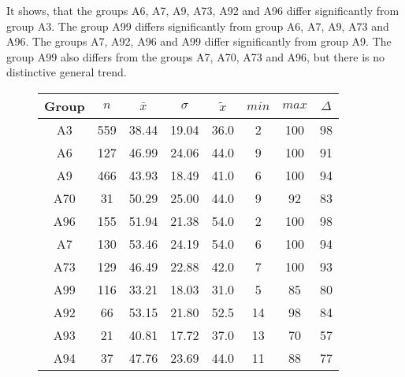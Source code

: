 It shows, that the groups A6, A7, A9, A73, A92 and A96 differ significantly from group A3. The group A99 differs significantly from group A6, A7, A9, A73 and A96. The groups A7, A92, A96 and A99 differ significantly from group A9. The group A99 also differs from the groups A7, A70, A73 and A96, but there is no distinctive general trend. 
\begin{figure}[ht!]
	\centering
	\begin{minipage}{0.5\textwidth}
		\tiny
		\setlength{\tabcolsep}{4pt}
		\centering
		\begin{tabular}{c|c|c|c|c|c|c|c}
			\toprule
			Group & $n$ & $\bar{x}$ & $\sigma$ & $\tilde{x}$ & $min$ & $max$ & $\Delta$ \\
			\midrule
			A3  & 559 & 38.44 & 19.04 & 36.0 & 2  & 100 & 98 \\ 
			A6  & 127 & 46.99 & 24.06 & 44.0 & 9  & 100 & 91 \\ 
			A9  & 466 & 43.93 & 18.49 & 41.0 & 6  & 100 & 94 \\ 
			A70 & 31  & 50.29 & 25.00 & 44.0 & 9  & 92  & 83 \\ 
			A96 & 155 & 51.94 & 21.38 & 54.0 & 2  & 100 & 98 \\ 
			A7  & 130 & 53.46 & 24.19 & 54.0 & 6  & 100 & 94 \\ 
			A73 & 129 & 46.49 & 22.88 & 42.0 & 7  & 100 & 93 \\ 
			A99 & 116 & 33.21 & 18.03 & 31.0 & 5  & 85  & 80 \\ 
			A92 & 66  & 53.15 & 21.80 & 52.5 & 14 & 98  & 84 \\ 
			A93 & 21  & 40.81 & 17.72 & 37.0 & 13 & 70  & 57 \\ 
			A94 & 37  & 47.76 & 23.69 & 44.0 & 11 & 88  & 77 \\ 
			\bottomrule
		\end{tabular}
		\label{tbl:descriptives_baysis_matched_Str_Cov}
	\end{minipage}%
	\begin{minipage}{0.55\textwidth}
\end{minipage}
\end{figure}
